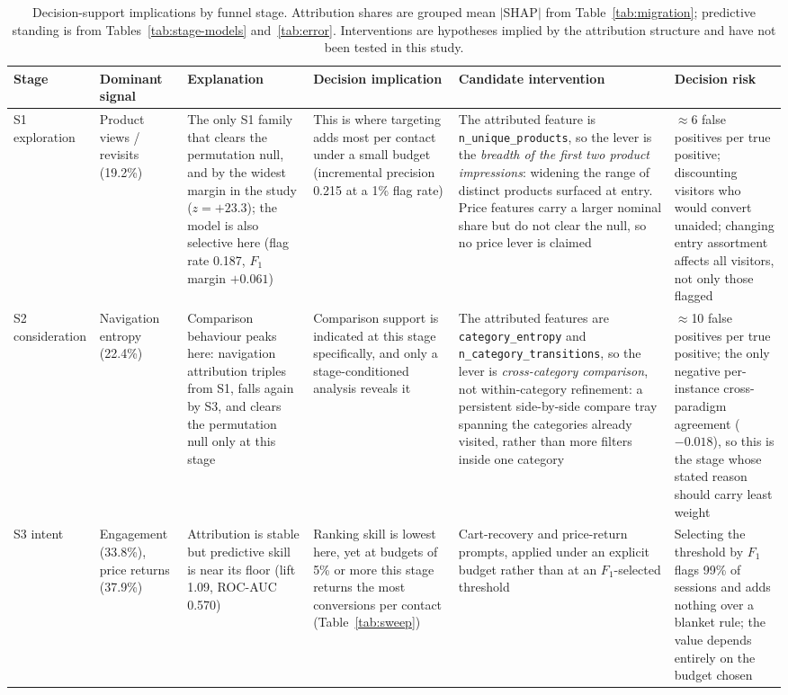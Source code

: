 \documentclass[a4paper]{article}
\begin{document}
\begin{table}[htbp]
\centering
\caption{Decision-support implications by funnel stage. Attribution shares are
grouped mean $|$SHAP$|$ from Table~\ref{tab:migration}; predictive standing is
from Tables~\ref{tab:stage-models} and~\ref{tab:error}. Interventions are
hypotheses implied by the attribution structure and have not been tested in
this study.}
\label{tab:decision}
\scriptsize
\begin{tabular}{@{}p{1.3cm}p{2.5cm}p{3.1cm}p{3.1cm}p{2.9cm}p{2.6cm}@{}}
\toprule
\textbf{Stage} & \textbf{Dominant signal} & \textbf{Explanation} &
\textbf{Decision implication} & \textbf{Candidate intervention} &
\textbf{Decision risk} \\
\midrule
S1 \newline exploration &
Product views / revisits (19.2\%) &
The only S1 family that clears the permutation null, and by the widest margin
in the study ($z = +23.3$); the model is also selective here
(flag rate 0.187, $F_1$ margin $+0.061$) &
This is where targeting adds most per contact under a small budget
(incremental precision 0.215 at a 1\% flag rate) &
The attributed feature is \texttt{n\_unique\_products}, so the lever is the
\emph{breadth of the first two product impressions}: widening the range of
distinct products surfaced at entry. Price features carry a larger nominal
share but do not clear the null, so no price lever is claimed &
$\approx$6 false positives per true positive; discounting visitors who would
convert unaided; changing entry assortment affects all visitors, not only
those flagged \\
\addlinespace
S2 \newline consideration &
Navigation entropy (22.4\%) &
Comparison behaviour peaks here: navigation attribution triples from S1, falls
again by S3, and clears the permutation null only at this stage &
Comparison support is indicated at this stage specifically, and only a
stage-conditioned analysis reveals it &
The attributed features are \texttt{category\_entropy} and
\texttt{n\_category\_transitions}, so the lever is \emph{cross-category
comparison}, not within-category refinement: a persistent side-by-side
compare tray spanning the categories already visited, rather than more
filters inside one category &
$\approx$10 false positives per true positive; the only negative
per-instance cross-paradigm agreement ($-0.018$), so this is the stage whose
stated reason should carry least weight \\
\addlinespace
S3 \newline intent &
Engagement (33.8\%), price returns (37.9\%) &
Attribution is stable but predictive skill is near its floor
(lift 1.09, ROC-AUC 0.570) &
Ranking skill is lowest here, yet at budgets of 5\% or more this stage
returns the most conversions per contact (Table~\ref{tab:sweep}) &
Cart-recovery and price-return prompts, applied under an explicit budget
rather than at an $F_1$-selected threshold &
Selecting the threshold by $F_1$ flags 99\% of sessions and adds nothing
over a blanket rule; the value depends entirely on the budget chosen \\
\bottomrule
\end{tabular}
\end{table}
\end{document}

